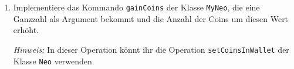 \begin{enumerate}
            Es kann vorkommen, dass wir den Kommandos oder Abfragen, die wir ausführen, zusätzliche Informationen mitgeben wollen. Hierzu können wir Werte an Operationen übergeben, die \emph{Argmente} heißen. Diese schreiben wir in die Klammern hinter dem Operationsnamen. Eine \footnote{zugegebenermaßen nicht allzu sinnvolle} Operation, die zwei Zahlen addiert, würde zum Beispiel so aussehen:
        \begin{lstlisting}
    public int add(final int a, final int b) {
        return a + b;
    }
        \end{lstlisting}
        Das \lstinline{final} hierbei bedeutet, dass wir den Wert des Arguments in der Operation nicht verändern können.
    
        \item Implementiere das Kommando \lstinline{gainCoins} der Klasse \lstinline{MyNeo}, die eine Ganzzahl als Argument bekommt und die Anzahl der Coins um diesen Wert erhöht.
    
        \emph{Hinweis:} In dieser Operation könnt ihr die Operation \lstinline{setCoinsInWallet} der Klasse \lstinline{Neo} verwenden.\par
    \end{enumerate}
